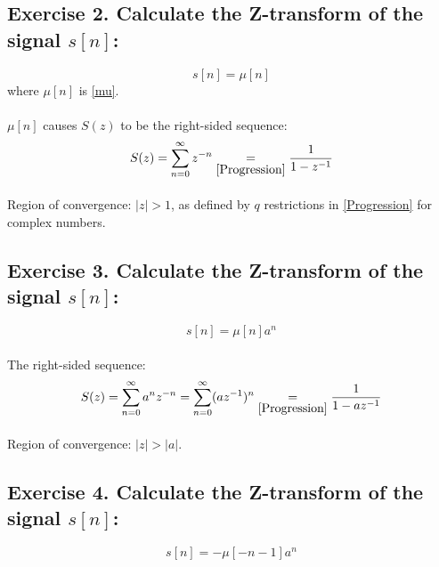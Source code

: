 \documentclass[14pt]{article}
\begin{document}
\subsection{Exercise 2. Calculate the Z-transform of the signal 
	$ s[n] $:}
\begin{equation}
	s[n] 
	=
	\mu[n]
\end{equation}
where $ \mu[n] $ is \eqref{mu}.

\paragraph{}
$ \mu[n] $ causes $ S(z) $ to be the right-sided sequence:
\begin{equation}
	S(z)
	=
	\sum_{n = 0}^{\infty} z^{-n} 
	\underset{\eqref{Progression}}{=}
	\frac{1}{1 - z^{-1}}
\end{equation}

\paragraph{}
Region of convergence: $ |z| > 1 $, as defined by $ q $ restrictions 
	in \eqref{Progression} for complex numbers.

\subsection{Exercise 3. Calculate the Z-transform of the signal 
	$ s[n] $:}
\begin{equation}
	s[n]
	=
	\mu[n] a^n
\end{equation}

\paragraph{}
The right-sided sequence:
\begin{equation}
	S(z) 
	=
	\sum_{n = 0}^\infty a^n z^{-n}
	=
	\sum_{n = 0}^\infty (a z^{-1})^n 
	\underset{\eqref{Progression}}{=}
	\frac{1}{1-a z^{-1}}
\end{equation}

\paragraph{}
Region of convergence: $ |z| > |a| $.

\subsection{Exercise 4. Calculate the Z-transform of the signal 
	$ s[n] $:}
\begin{equation}
	s[n]
	=
	-\mu[-n - 1] a^n
\end{equation}
\end{document}
